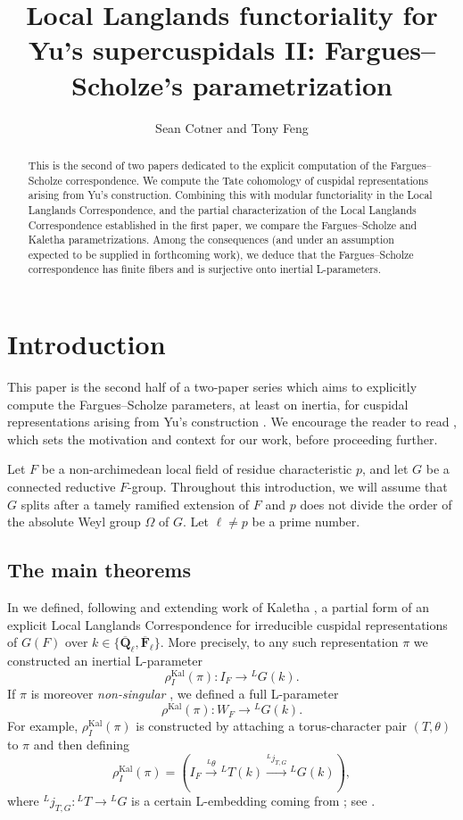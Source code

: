 \documentclass[reqno]{amsart}
\title[Local Langlands functoriality for Yu's supercuspidals II]{Local Langlands functoriality for Yu's supercuspidals II: Fargues--Scholze's parametrization}
\author{Sean Cotner and Tony Feng}
\numberwithin{equation}{subsection}
\newcommand{\F}{\mathbf{F}}
\newcommand{\Q}{\mathbf{Q}}
\newcommand{\ol}[1]{\overline{#1}}
\newcommand{\co}{\colon}
\newcommand{\ld}{{}^L}
\DeclareMathOperator{\Kal}{Kal}
\theoremstyle{remark}
\numberwithin{equation}{subsection}
\numberwithin{figure}{subsection}
\begin{document}
\begin{abstract}
This is the second of two papers dedicated to the explicit computation of the Fargues--Scholze correspondence. We compute the Tate cohomology of cuspidal representations arising from Yu's construction. Combining this with modular functoriality in the Local Langlands Correspondence, and the partial characterization of the Local Langlands Correspondence established in the first paper, we compare the Fargues--Scholze and Kaletha parametrizations. Among the consequences (and under an assumption expected to be supplied in forthcoming work), we deduce that the Fargues--Scholze correspondence has finite fibers and is surjective onto inertial L-parameters.
\end{abstract}

\maketitle

\tableofcontents

\section{Introduction}
This paper is the second half of a two-paper series which aims to explicitly compute the Fargues--Scholze parameters, at least on inertia, for cuspidal representations arising from Yu's construction \cite{Yu01}. We encourage the reader to read \cite[\S 1.1]{CF26a}, which sets the motivation and context for our work, before proceeding further. 

Let $F$ be a non-archimedean local field of residue characteristic $p$, and let $G$ be a connected reductive $F$-group. Throughout this introduction, we will assume that $G$ splits after a tamely ramified extension of $F$ and $p$ does not divide the order of the absolute Weyl group $\Omega$ of $G$. Let $\ell \neq p$ be a prime number.

\subsection{The main theorems}

In \cite{CF26a} we defined, following and extending work of Kaletha \cite{Kal19,Kal21b}, a partial form of an explicit Local Langlands Correspondence for irreducible cuspidal representations of $G(F)$ over $k \in \{\ol\Q_\ell, \ol\F_\ell\}$. More precisely, to any such representation $\pi$ we constructed an inertial L-parameter \cite[Definition~7.2.12]{CF26a}
\[
\rho_I^{\Kal}(\pi) : I_F \rightarrow \ld G(k).
\]
If $\pi$ is moreover \emph{non-singular} \cite[Definition~7.2.10]{CF26a}, we defined a full L-parameter 
\[
\rho^{\Kal}(\pi) : W_F \rightarrow \ld G(k).
\]
For example, $\rho_I^{\Kal}(\pi)$ is constructed by attaching a torus-character pair $(T, \theta)$ to $\pi$ and then defining
\[
\rho_I^{\Kal}(\pi) = \left(I_F \xrightarrow{\ld\theta} \ld T(k) \xrightarrow{\ld j_{T,G}} \ld G(k) \right),
\]
where $\ld j_{T,G}\co \ld T \to \ld G$ is a certain L-embedding coming from \cite{FKS23}; see \cite[Definition~4.5.1]{CF26a}. 
\end{document}
